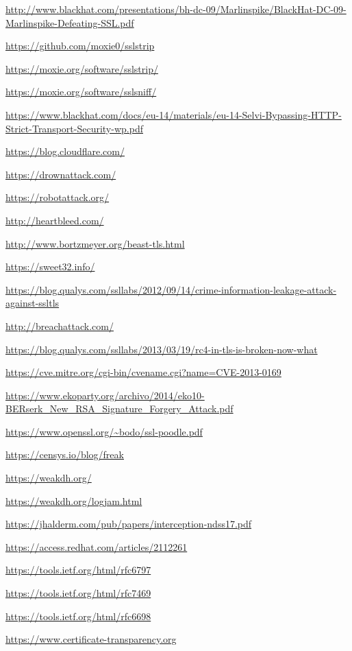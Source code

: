 \begin{thebibliography}{4}

  \url{http://www.blackhat.com/presentations/bh-dc-09/Marlinspike/BlackHat-DC-09-Marlinspike-Defeating-SSL.pdf}

  \url{https://github.com/moxie0/sslstrip}

  \url{https://moxie.org/software/sslstrip/}

  \url{https://moxie.org/software/sslsniff/}

  \url{https://www.blackhat.com/docs/eu-14/materials/eu-14-Selvi-Bypassing-HTTP-Strict-Transport-Security-wp.pdf}
  
  \url{https://blog.cloudflare.com/}

  \url{https://drownattack.com/}

  \url{https://robotattack.org/}

  \url{http://heartbleed.com/}

  \url{http://www.bortzmeyer.org/beast-tls.html}

  \url{https://sweet32.info/}

  \url{https://blog.qualys.com/ssllabs/2012/09/14/crime-information-leakage-attack-against-ssltls}

  \url{http://breachattack.com/}

  \url{https://blog.qualys.com/ssllabs/2013/03/19/rc4-in-tls-is-broken-now-what}

  \url{https://cve.mitre.org/cgi-bin/cvename.cgi?name=CVE-2013-0169}

  \url{https://www.ekoparty.org/archivo/2014/eko10-BERserk_New_RSA_Signature_Forgery_Attack.pdf}

  \url{https://www.openssl.org/~bodo/ssl-poodle.pdf}

  \url{https://censys.io/blog/freak}

  \url{https://weakdh.org/}

  \url{https://weakdh.org/logjam.html}

  \url{https://jhalderm.com/pub/papers/interception-ndss17.pdf}

  \url{https://access.redhat.com/articles/2112261}

  \url{https://tools.ietf.org/html/rfc6797}

  \url{https://tools.ietf.org/html/rfc7469}

  \url{https://tools.ietf.org/html/rfc6698}

  \url{https://www.certificate-transparency.org}

\end{thebibliography}
